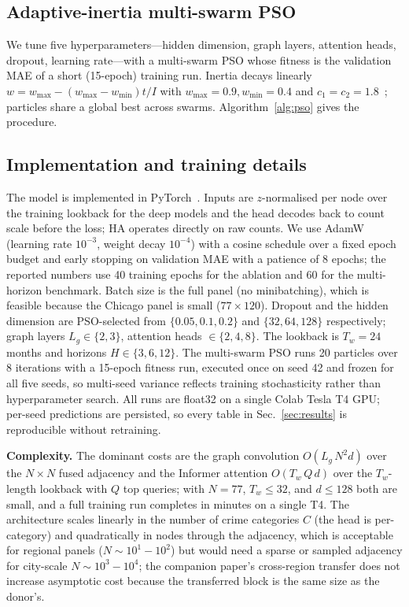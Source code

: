 \documentclass[11pt,conference]{IEEEtran}
\begin{document}
\subsection{Adaptive-inertia multi-swarm PSO}\label{sec:pso}
We tune five hyperparameters---hidden dimension, graph layers, attention heads,
dropout, learning rate---with a multi-swarm PSO whose fitness is the validation
MAE of a short (15-epoch) training run. Inertia decays linearly
$w=w_{\max}-(w_{\max}-w_{\min})t/I$ with $w_{\max}{=}0.9,w_{\min}{=}0.4$ and
$c_1{=}c_2{=}1.8$~\cite{shi2001inertia}; particles share a global best across
swarms. Algorithm~\ref{alg:pso} gives the procedure.

\subsection{Implementation and training details}\label{sec:impl}
The model is implemented in PyTorch~\cite{pytorch}. Inputs are $z$-normalised
per node over the training lookback for the deep models and the head decodes
back to count scale before the loss; HA operates directly on raw counts. We
use AdamW (learning rate $10^{-3}$, weight decay $10^{-4}$) with a cosine
schedule over a fixed epoch budget and early stopping on validation MAE with a
patience of 8 epochs; the reported numbers use 40 training epochs for the
ablation and 60 for the multi-horizon benchmark. Batch size is the full panel
(no minibatching), which is feasible because the Chicago panel is small
($77\times120$). Dropout and the hidden dimension are PSO-selected from
$\{0.05,0.1,0.2\}$ and $\{32,64,128\}$ respectively; graph layers
$L_g\in\{2,3\}$, attention heads $\in\{2,4,8\}$. The lookback is $T_w{=}24$
months and horizons $H\in\{3,6,12\}$. The multi-swarm PSO runs 20 particles
over 8 iterations with a 15-epoch fitness run, executed once on seed 42 and
frozen for all five seeds, so multi-seed variance reflects training
stochasticity rather than hyperparameter search. All runs are float32 on a
single Colab Tesla T4 GPU; per-seed predictions are persisted, so every table
in Sec.~\ref{sec:results} is reproducible without retraining.

\textbf{Complexity.} The dominant costs are the graph convolution
$O(L_g\, N^2 d)$ over the $N{\times}N$ fused adjacency and the Informer
attention $O(T_w\, Q\, d)$ over the $T_w$-length lookback with $Q$ top queries;
with $N{=}77$, $T_w{\le}32$, and $d{\le}128$ both are small, and a full
training run completes in minutes on a single T4. The architecture scales
linearly in the number of crime categories $C$ (the head is
per-category) and quadratically in nodes through the adjacency, which is
acceptable for regional panels ($N\!\sim\!10^{1}\!-\!10^{2}$) but would need a
sparse or sampled adjacency for city-scale $N\!\sim\!10^{3}\!-\!10^{4}$; the
companion paper's cross-region transfer does not increase asymptotic cost
because the transferred block is the same size as the donor's.
\end{document}
